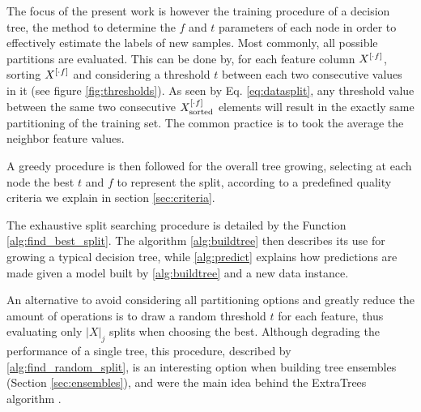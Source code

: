 The focus of the present work is however the training procedure of a decision tree, the method to determine the $f$ and $t$ parameters of each node in order to effectively estimate the labels of new samples. Most commonly, all possible partitions are evaluated.
This can be done by, for each feature column $X^{[\cdot f]}$, sorting $X^{[\cdot f]}$ and considering a threshold $t$ between each two consecutive values in it (see figure \ref{fig:thresholds}). As seen by Eq. \ref{eq:datasplit}, any threshold value between the same two consecutive $X^{[\cdot f]}_\text{sorted}$ elements will result in the exactly same partitioning of the training set. The common practice is to took the average the neighbor feature values.

A greedy procedure is then followed for the overall tree growing, selecting at each node the best $t$ and $f$ to represent the split, according to a predefined quality criteria we explain in section \ref{sec:criteria}. 

The exhaustive split searching procedure is detailed by the Function \ref{alg:find_best_split}. The algorithm \ref{alg:buildtree} then describes its use for growing a typical decision tree, while \ref{alg:predict} explains how predictions are made given a model built by \ref{alg:buildtree} and a new data instance.

An alternative to avoid considering all partitioning options and greatly reduce the amount of operations is to draw a random threshold $t$ for each feature, thus evaluating only $|X|_j$ splits when choosing the best. Although degrading the performance of a single tree, this procedure, described by \ref{alg:find_random_split}, is an interesting option when building tree ensembles (Section \ref{sec:ensembles}), and were the main idea behind the ExtraTrees algorithm \cite{}.

%

